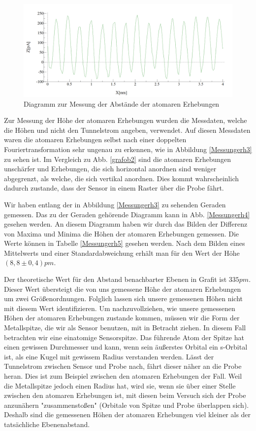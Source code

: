 \documentclass[10pt,a4paper]{article}
\begin{document}
\begin{figure}[h]
	\centering
	
	\includegraphics[scale = 0.3]{Aufnahme_Ebene_doppelte_fourier.png}
	
	\caption{Diagramm zur Messung der Abstände der atomaren Erhebungen}
	\label{Messungerh2}
\end{figure}

Zur Messung der Höhe der atomaren Erhebungen wurden die Messdaten, welche die Höhen und nicht den Tunnelstrom angeben, verwendet. Auf diesen Messdaten waren die atomaren Erhebungen selbst nach einer doppelten Fouriertransformation sehr ungenau zu erkennen, wie in Abbildung \ref{Messungerh3} zu sehen ist. Im Vergleich zu Abb. \ref{grafob2} sind die atomaren Erhebungen unschärfer und Erhebungen, die sich horizontal anordnen sind weniger abgegrenzt, als welche, die sich vertikal anordnen. Dies kommt wahrscheinlich dadurch zustande, dass der Sensor in einem Raster über die Probe fährt.

Wir haben entlang der in Abbildung \ref{Messungerh3} zu sehenden Geraden gemessen. Das zu der Geraden gehörende Diagramm kann in Abb. \ref{Messungerh4} gesehen werden. An diesem Diagramm haben wir durch das Bilden der Differenz von Maxima und Minima die Höhen der atomaren Erhebungen gemessen. Die Werte können in Tabelle \ref{Messungerh5} gesehen werden. Nach dem Bilden eines Mittelwerts und einer Standardabweichung erhält man für den Wert der Höhe $(8,8 \pm 0,4) pm$.

Der theoretische Wert für den Abstand benachbarter Ebenen in Grafit ist $335 pm$. Dieser Wert übersteigt die von uns gemessene Höhe der atomaren Erhebungen um zwei Größenordnungen. Folglich lassen sich unsere gemessenen Höhen nicht mit diesem Wert identifizieren. Um nachzuvollziehen, wie unsere gemessenen Höhen der atomaren Erhebungen zustande kommen, müssen wir die Form der Metallspitze, die wir als Sensor benutzen, mit in Betracht ziehen. In diesem Fall betrachten wir eine einatomige Sensorspitze. Das führende Atom der Spitze hat einen gewissen Durchmesser und kann, wenn sein äußerstes Orbital ein s-Orbital ist, als eine Kugel mit gewissem Radius verstanden werden. Lässt der Tunnelstrom zwischen Sensor und Probe nach, fährt dieser näher an die Probe heran. Dies ist zum Beispiel zwischen den atomaren Erhebungen der Fall. Weil die Metallspitze jedoch einen Radius hat, wird sie, wenn sie über einer Stelle zwischen den atomaren Erhebungen ist, mit diesen beim Versuch sich der Probe anzunähern "zusammenstoßen" (Orbitale von Spitze und Probe überlappen sich). Deshalb sind die gemessenen Höhen der atomaren Erhebungen viel kleiner als der tatsächliche Ebenenabstand.
\end{document}

